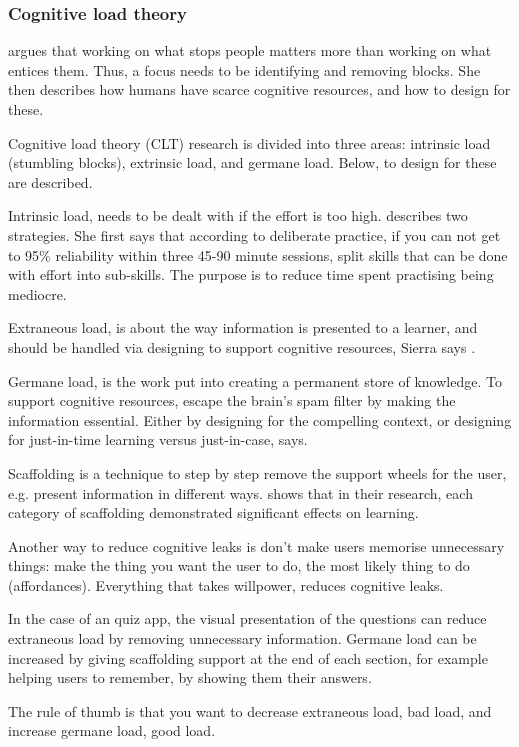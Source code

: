 \subsubsection{Cognitive load theory}

\cite{sierra} argues that working on what stops people matters more than working on what entices them. Thus, a focus needs to be identifying and removing blocks. She then describes how humans have scarce cognitive resources, and how to design for these.

Cognitive load theory (CLT) research is divided into three areas: intrinsic load (stumbling blocks), extrinsic load, and germane load. Below, to design for these are described.

Intrinsic load, needs to be dealt with if the effort is too high. \cite{sierra} describes two strategies. She first says that according to deliberate practice, if you can not get to 95\% reliability within three 45-90 minute sessions, split skills that can be done with effort into sub-skills. The purpose is to reduce time spent practising being mediocre.

Extraneous load, is about the way information is presented to a learner, and should be handled via designing to support cognitive resources, Sierra says \citep{sierra}.

Germane load, is the work put into creating a permanent store of knowledge. To support cognitive resources, escape the brain's spam filter by making the information essential. Either by designing for the compelling context, or designing for just-in-time learning versus just-in-case, \cite{sierra} says.

Scaffolding is a technique to step by step remove the support wheels for the user, e.g. present information in different ways. \cite{gates} shows that in their research, each category of scaffolding demonstrated significant effects on learning.

Another way to reduce cognitive leaks is don't make users memorise unnecessary things: make the thing you want the user to do, the most likely thing to do (affordances). Everything that takes willpower, reduces cognitive leaks.

In the case of an quiz app, the visual presentation of the questions can reduce extraneous load by removing unnecessary information. Germane load can be increased by giving scaffolding support at the end of each section, for example helping users to remember, by showing them their answers.

The rule of thumb is that you want to decrease extraneous load, bad load, and increase germane load, good load.

